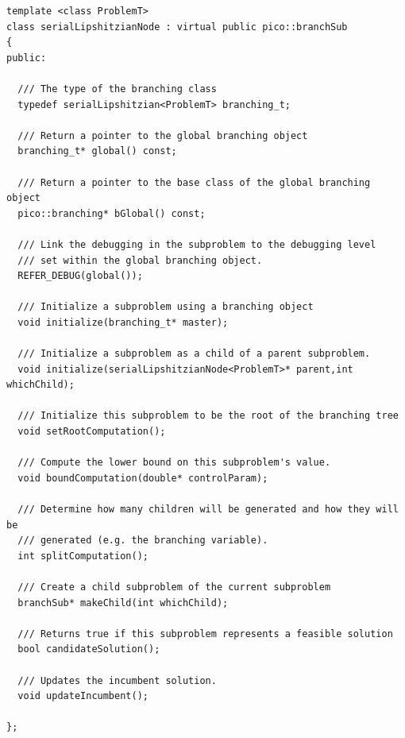 {\small
\begin{verbatim}
template <class ProblemT>
class serialLipshitzianNode : virtual public pico::branchSub
{
public:

  /// The type of the branching class
  typedef serialLipshitzian<ProblemT> branching_t;

  /// Return a pointer to the global branching object
  branching_t* global() const;

  /// Return a pointer to the base class of the global branching object
  pico::branching* bGlobal() const;

  /// Link the debugging in the subproblem to the debugging level
  /// set within the global branching object.
  REFER_DEBUG(global());

  /// Initialize a subproblem using a branching object
  void initialize(branching_t* master);

  /// Initialize a subproblem as a child of a parent subproblem.
  void initialize(serialLipshitzianNode<ProblemT>* parent,int whichChild);

  /// Initialize this subproblem to be the root of the branching tree
  void setRootComputation();

  /// Compute the lower bound on this subproblem's value.
  void boundComputation(double* controlParam);

  /// Determine how many children will be generated and how they will be
  /// generated (e.g. the branching variable).
  int splitComputation();

  /// Create a child subproblem of the current subproblem
  branchSub* makeChild(int whichChild);

  /// Returns true if this subproblem represents a feasible solution
  bool candidateSolution();

  /// Updates the incumbent solution.
  void updateIncumbent();

};
\end{verbatim}
}

